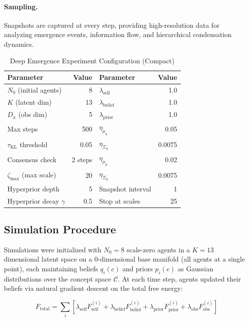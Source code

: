 \documentclass[11pt]{article}
\begin{document}
\paragraph{Sampling.}
Snapshots are captured at every step, providing high-resolution data for analyzing emergence events, information flow, and hierarchical condensation dynamics.



\begin{table}[htbp]
\centering
\caption{Deep Emergence Experiment Configuration (Compact)}
\label{tab:deep_emergence_compact}
\small
\begin{tabular}{lr|lr}
\toprule
\textbf{Parameter} & \textbf{Value} & \textbf{Parameter} & \textbf{Value} \\
\midrule
$N_0$ (initial agents) & 8 & $\lambda_{\text{self}}$ & 1.0 \\
$K$ (latent dim) & 13 & $\lambda_{\text{belief}}$ & 1.0 \\
$D_x$ (obs dim) & 5 & $\lambda_{\text{prior}}$ & 1.0 \\
Max steps & 500 & $\eta_{\mu_q}$ & 0.05 \\
$\tau_{\text{KL}}$ threshold & 0.05 & $\eta_{\Sigma_q}$ & 0.0075 \\
Consensus check & 2 steps & $\eta_{\mu_p}$ & 0.02 \\
$\zeta_{\max}$ (max scale) & 20 & $\eta_{\Sigma_p}$ & 0.0075 \\
Hyperprior depth & 5 & Snapshot interval & 1 \\
Hyperprior decay $\gamma$ & 0.5 & Stop at scales & 25 \\
\bottomrule
\end{tabular}
\end{table}




\subsection{Simulation Procedure}

Simulations were initialized with $N_0 = 8$ scale-zero agents in a $K=13$ dimensional latent space on a 0-dimensional base manifold (all agents at a single point), each maintaining beliefs $q_i(c)$ and priors $p_i(c)$ as Gaussian distributions over the concept space $\mathcal{C}$. At each time step, agents updated their beliefs via natural gradient descent on the total free energy:
%

\begin{equation}
F_{\text{total}} = \sum_i \left[ \lambda_{\text{self}} F_{\text{self}}^{(i)} + \lambda_{\text{belief}} F_{\text{belief}}^{(i)} + \lambda_{\text{prior}} F_{\text{prior}}^{(i)} + \lambda_{\text{obs}} F_{\text{obs}}^{(i)} \right]
\end{equation}
\end{document}
